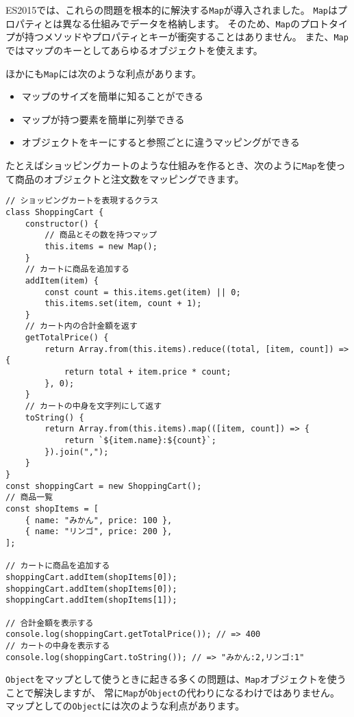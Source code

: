 ES2015では、これらの問題を根本的に解決する\texttt{Map}が導入されました。
\texttt{Map}はプロパティとは異なる仕組みでデータを格納します。
そのため、\texttt{Map}のプロトタイプが持つメソッドやプロパティとキーが衝突することはありません。
また、\texttt{Map}ではマップのキーとしてあらゆるオブジェクトを使えます。

ほかにも\texttt{Map}には次のような利点があります。

\begin{itemize}
\item
  マップのサイズを簡単に知ることができる
\item
  マップが持つ要素を簡単に列挙できる
\item
  オブジェクトをキーにすると参照ごとに違うマッピングができる
\end{itemize}

たとえばショッピングカートのような仕組みを作るとき、次のように\texttt{Map}を使って商品のオブジェクトと注文数をマッピングできます。

\begin{lstlisting}
// ショッピングカートを表現するクラス
class ShoppingCart {
    constructor() {
        // 商品とその数を持つマップ
        this.items = new Map();
    }
    // カートに商品を追加する
    addItem(item) {
        const count = this.items.get(item) || 0;
        this.items.set(item, count + 1);
    }
    // カート内の合計金額を返す
    getTotalPrice() {
        return Array.from(this.items).reduce((total, [item, count]) => {
            return total + item.price * count;
        }, 0);
    }
    // カートの中身を文字列にして返す
    toString() {
        return Array.from(this.items).map(([item, count]) => {
            return `${item.name}:${count}`;
        }).join(",");
    }
}
const shoppingCart = new ShoppingCart();
// 商品一覧
const shopItems = [
    { name: "みかん", price: 100 },
    { name: "リンゴ", price: 200 },
];

// カートに商品を追加する
shoppingCart.addItem(shopItems[0]);
shoppingCart.addItem(shopItems[0]);
shoppingCart.addItem(shopItems[1]);

// 合計金額を表示する
console.log(shoppingCart.getTotalPrice()); // => 400
// カートの中身を表示する
console.log(shoppingCart.toString()); // => "みかん:2,リンゴ:1"
\end{lstlisting}

\texttt{Object}をマップとして使うときに起きる多くの問題は、\texttt{Map}オブジェクトを使うことで解決しますが、
常に\texttt{Map}が\texttt{Object}の代わりになるわけではありません。
マップとしての\texttt{Object}には次のような利点があります。

